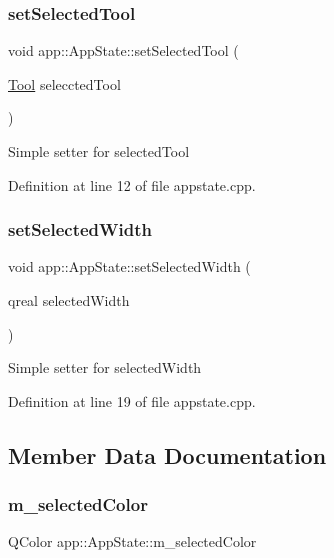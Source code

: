 \subsubsection{\texorpdfstring{set\+Selected\+Tool}{setSelectedTool}}
{\footnotesize\ttfamily void app\+::\+App\+State\+::set\+Selected\+Tool (\begin{DoxyParamCaption}\item[{\mbox{\hyperlink{classapp_1_1_app_state_aa641298e5827611da2512591c4a0e966}{Tool}}}]{seleccted\+Tool }\end{DoxyParamCaption})\hspace{0.3cm}{\ttfamily [slot]}}

Simple setter for selected\+Tool 

Definition at line 12 of file appstate.\+cpp.

\mbox{\label{classapp_1_1_app_state_aa7d1b711173cc1ccce7b747d493aa549}} 
\subsubsection{\texorpdfstring{set\+Selected\+Width}{setSelectedWidth}}
{\footnotesize\ttfamily void app\+::\+App\+State\+::set\+Selected\+Width (\begin{DoxyParamCaption}\item[{qreal}]{selected\+Width }\end{DoxyParamCaption})\hspace{0.3cm}{\ttfamily [slot]}}

Simple setter for selected\+Width 

Definition at line 19 of file appstate.\+cpp.



\subsection{Member Data Documentation}
\mbox{\label{classapp_1_1_app_state_a5ad9b96983f21e5718f84d1571f15b7b}} 
\subsubsection{\texorpdfstring{m\+\_\+selected\+Color}{m\_selectedColor}}
{\footnotesize\ttfamily Q\+Color app\+::\+App\+State\+::m\+\_\+selected\+Color\hspace{0.3cm}{\ttfamily [private]}}



